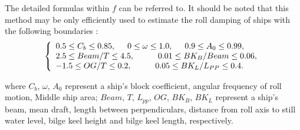 The detailed formulas within $f$ can be referred to\parencite{ikeda_velocity_1979, kawahara_simple_2011}. It should be noted that this method may be only efficiently used to estimate the roll damping of ships with the following boundaries \parencite{kawahara_simple_2011}:
\begin{equation}
    \label{eq:SI_limits}
     \left\{
     \begin{array}{ll}
    0.5 \leq C_b \leq 0.85,\hspace{0.5cm} 
    0 \leq \omega \leq 1.0,
    \hspace{0.5cm}
    0.9 \leq A_0 \leq 0.99,\\
    2.5\leq Beam/T \leq 4.5, \hspace{1cm}
    0.01 \leq BK_B/Beam \leq 0.06, \\
        -1.5 \leq OG/T \leq 0.2,
     \hspace{1cm}
    0.05 \leq BK_L/L_{PP} \leq 0.4.
    \end{array}
    \right.
\end{equation}

where $C_b$, $\omega$, $A_0$ represent a ship's block coefficient, angular frequency of roll motion, Middle ship area;  $Beam$, $T$, $L_{pp}$, $OG$, $BK_B$, $BK_L$ represent a ship's beam, mean draft, length between perpendiculars, distance from roll axis to still water level, bilge keel height and bilge keel length, respectively.








